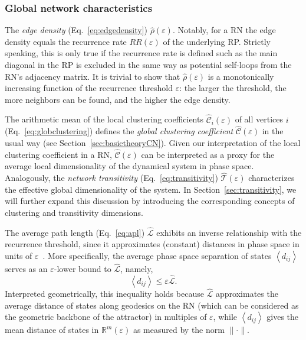 		\subsubsection{Global network characteristics} \label{subsubsec:RNmeasureG}
		The \textit{edge density} (Eq.~\ref{eq:edgedensity}) $\hat{\rho}(\varepsilon)$. Notably, for a RN the edge density equals the recurrence rate $RR(\varepsilon)$ of the underlying RP. Strictly speaking, this is only true if the recurrence rate is defined such as the main diagonal in the RP is excluded in the same way as potential self-loops from the RN's adjacency matrix. It is trivial to show that $\hat{\rho}(\varepsilon)$ is a monotonically increasing function of the recurrence threshold $\varepsilon$: the larger the threshold, the more neighbors can be found, and the higher the edge density.

		The arithmetic mean of the local clustering coefficients $\hat{\mathcal{C}}_i(\varepsilon)$ of all vertices $i$ (Eq.~\ref{eq:globclustering}) defines the \emph{global clustering coefficient} $\hat{\mathcal{C}}(\varepsilon)$ in the usual way (see Section~\ref{sec:basictheoryCN}). Given our interpretation of the local clustering coefficient in a RN, $\hat{\mathcal{C}}(\varepsilon)$ can be interpreted as a proxy for the average local dimensionality of the dynamical system in phase space. Analogously, the \textit{network transitivity} (Eq.~\ref{eq:transitivity}) $\hat{\mathcal{T}}(\varepsilon)$ characterizes the effective global dimensionality of the system. In Section~\ref{sec:transitivity}, we will further expand this discussion by introducing the corresponding concepts of clustering and transitivity dimensions.

		The average path length (Eq.~\ref{eq:apl}) $\hat{\mathcal{L}}$ exhibits an inverse relationship with the recurrence threshold, since it approximates (constant) distances in phase space in units of $\varepsilon$~\cite{Donner2010a}. More specifically, the average phase space separation of states $\left<d_{ij}\right>$ serves as an $\varepsilon$-lower bound to $\hat{\mathcal{L}}$, namely,
\begin{equation}
\left<d_{ij}\right> \leq \varepsilon \hat{\mathcal{L}}. \label{avgL_eq}
\end{equation}
Interpreted geometrically, this inequality holds because $\hat{\mathcal{L}}$ approximates the average distance of states along geodesics on the RN (which can be considered as the geometric backbone of the attractor) in multiples of $\varepsilon$, while $\left<d_{ij}\right>$ gives the mean distance of states in $\mathbb{R}^m(\varepsilon)$ as measured by the norm $\|\cdot\|$.

